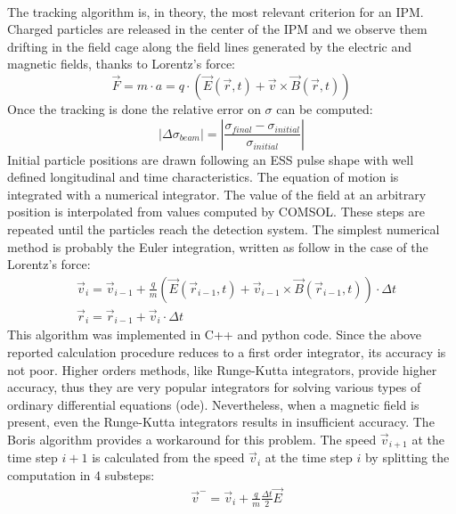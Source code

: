 \begin{refsection}
  \paragraph{}
  The tracking algorithm is, in theory, the most relevant criterion for an IPM. Charged particles are released in the center of the IPM and we observe them drifting in the field cage along the field lines generated by the electric and magnetic fields, thanks to Lorentz’s force:
  \begin{equation}
    \vec{F} = m \cdot a = q \cdot (\vec{E}(\vec{r},t) + \vec{v} \times \vec{B}(\vec{r},t))
  \end{equation}
  Once the tracking is done the relative error on $\sigma$ can be computed:
  \begin{equation}
    \left| \Delta \sigma_{beam} \right| = \left|\frac{\sigma_{final} - \sigma_{initial}}{\sigma_{initial}} \right|
  \end{equation}
  Initial particle positions are drawn following an ESS pulse shape with well defined longitudinal and time characteristics. The equation of motion is integrated with a numerical integrator. The value of the field at an arbitrary position is interpolated from values computed by COMSOL. These steps are repeated until the particles reach the detection system. The simplest numerical method is probably the Euler integration, written as follow in the case of the Lorentz’s force:
  \begin{align}
     & \vec{v}_{i} = \vec{v}_{i-1} + \frac{q}{m}(\vec{E}(\vec{r}_{i-1},t) + \vec{v}_{i-1} \times \vec{B}(\vec{r}_{i-1},t)) \cdot \Delta t \\
     & \vec{r}_{i} = \vec{r}_{i-1} + \vec{v}_{i} \cdot \Delta t
  \end{align}
  This algorithm was implemented in C++ and python code. Since the above reported calculation procedure reduces to a first order integrator, its accuracy is not poor. Higher orders methods, like Runge-Kutta integrators, provide higher accuracy, thus they are very popular integrators for solving various types of ordinary differential equations (\acrshort{ode}). Nevertheless, when a magnetic field is present, even the Runge-Kutta integrators results in insufficient accuracy. 
  The Boris algorithm \cite{Boris1970} provides a workaround for this problem. The speed $\vec{v}_{i+1}$ at the time step $i+1$ is calculated from the speed $\vec{v}_{i}$ at the time step $i$ by splitting the computation in 4 substeps:
  \begin{align}
     & \vec{v}^{-} = \vec{v}_{i} + \frac{q}{m} \frac{\Delta t}{2}\vec{E}                                                                 \\

\end{align}
\end{refsection}
